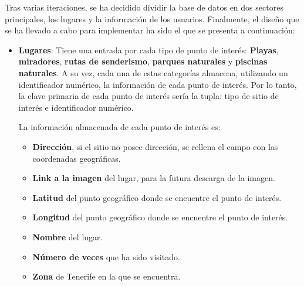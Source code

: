 Tras varias iteraciones, se ha decidido dividir la base de datos en dos sectores principales, los lugares y la información de los usuarios. Finalmente, el diseño que se ha llevado a cabo para implementar ha sido el que se presenta a continuación:

\begin{itemize}
\item \textbf{Lugares}: Tiene una entrada por cada tipo de punto de interés: \textbf{Playas}, \textbf{miradores}, \textbf{rutas de senderismo}, \textbf{parques naturales} y \textbf{piscinas naturales}. A su vez, cada una de estas categorías almacena, utilizando un identificador numérico, la información de cada punto de interés. Por lo tanto, la clave primaria de cada punto de interés sería la tupla: tipo de sitio de interés e identificador numérico.

La información almacenada de cada punto de interés es:
\begin{itemize}
    \item \textbf{Dirección}, si el sitio no posee dirección, se rellena el campo con las coordenadas geográficas.
    \item \textbf{Link a la imagen} del lugar, para la futura descarga de la imagen.
    \item \textbf{Latitud} del punto geográfico donde se encuentre el punto de interés.
    \item \textbf{Longitud} del punto geográfico donde se encuentre el punto de interés.
    \item \textbf{Nombre} del lugar.
    \item \textbf{Número de veces} que ha sido visitado.
    \item \textbf{Zona} de Tenerife en la que se encuentra.
\end{itemize}


\end{itemize}
